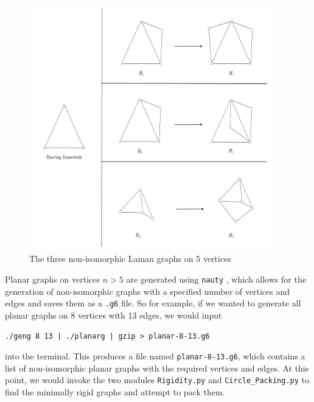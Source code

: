 \begin{figure}[htbp]
    \centering
    \includegraphics[width = 0.95\textwidth]{Chapter 4/4. n=5.png}
    \caption{The three non-isomorphic Laman graphs on 5 vertices}
    \label{fig4: n = 5 Laman}
\end{figure}

\begin{flushleft}
Planar graphs on vertices $n > 5$ are generated using \texttt{nauty} \cite{nauty}, which allows for the generation of non-isomorphic graphs with a specified number of vertices and edges and saves them as a \texttt{.g6} file. So for example, if we wanted to generate all planar graphs on 8 vertices with 13 edges, we would input
\end{flushleft}

\begin{center}
\texttt{./geng 8 13 | ./planarg | gzip > planar-8-13.g6}    
\end{center}

\begin{flushleft}
into the terminal. This produces a file named \texttt{planar-8-13.g6}, which contains a list of non-isomorphic planar graphs with the required vertices and edges. At this point, we would invoke the two modules \texttt{Rigidity.py} and \texttt{Circle\_Packing.py} to find the minimally rigid graphs and attempt to pack them.     
\end{flushleft}

